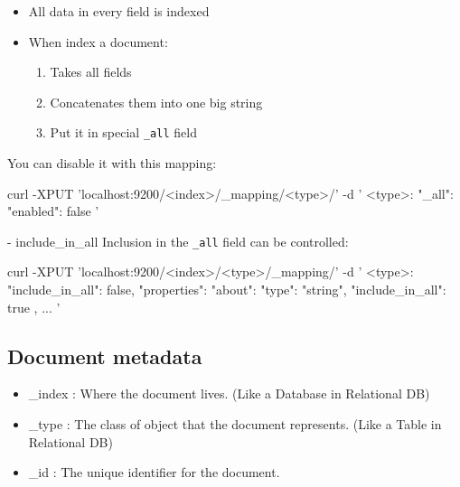 \documentclass[]{beamer}
\begin{document}
\begin{frame}[containsverbatim]{\subsecname{}}
  \begin{itemize}
    \item All data in every field is indexed
    \item When index a document:
    \begin{enumerate}
      \item Takes all fields
      \item Concatenates them into one big string
      \item Put it in special \texttt{\_all} field
    \end{enumerate}
  \end{itemize}

  You can disable it with this mapping:

  \begin{command}
curl -XPUT 'localhost:9200/<index>/_mapping/<type>/' -d '
{
    <type>: {
        "_all": { "enabled": false }
    }
}'
  \end{command}
\end{frame}

\begin{frame}[containsverbatim]{\subsecname{} - include\_in\_all}
  Inclusion in the \texttt{\_all} field can be controlled:

  \begin{command}
curl -XPUT 'localhost:9200/<index>/<type>/_mapping/' -d '
{
    <type>: {
        "include_in_all": false,
        "properties": {
            "about": {
                "type": "string",
                "include_in_all": true
            },
            ...
        }
    }
}'
  \end{command}
\end{frame}

\subsection{Document metadata}

\begin{frame}{\subsecname{}}
  \begin{itemize}
    \item \_index : Where the document lives. (Like a Database in Relational DB)
    \item \_type : The class of object that the document represents. (Like a Table in Relational DB)
    \item \_id : The unique identifier for the document.
  \end{itemize}
\end{frame}
\end{document}
